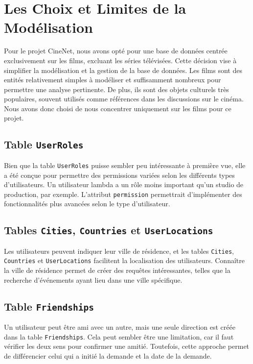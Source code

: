 \section{Les Choix et Limites de la Modélisation}

Pour le projet CineNet, nous avons opté pour une base de données centrée exclusivement sur les films, excluant les séries télévisées. Cette décision vise à simplifier la modélisation et la gestion de la base de données. Les films sont des entités relativement simples à modéliser et suffisamment nombreux pour permettre une analyse pertinente. De plus, ils sont des objets culturels très populaires, souvent utilisés comme références dans les discussions sur le cinéma. Nous avons donc choisi de nous concentrer uniquement sur les films pour ce projet.

\subsection*{Table \texttt{UserRoles}}

Bien que la table \texttt{UserRoles} puisse sembler peu intéressante à première vue, elle a été conçue pour permettre des permissions variées selon les différents types d'utilisateurs. Un utilisateur lambda a un rôle moins important qu'un studio de production, par exemple. L'attribut \texttt{permission} permettrait d'implémenter des fonctionnalités plus avancées selon le type d'utilisateur.

\subsection*{Tables \texttt{Cities}, \texttt{Countries} et \texttt{UserLocations}}

Les utilisateurs peuvent indiquer leur ville de résidence, et les tables \texttt{Cities}, \texttt{Countries} et \texttt{UserLocations} facilitent la localisation des utilisateurs. Connaître la ville de résidence permet de créer des requêtes intéressantes, telles que la recherche d'événements ayant lieu dans une ville spécifique.

\subsection*{Table \texttt{Friendships}}

Un utilisateur peut être ami avec un autre, mais une seule direction est créée dans la table \texttt{Friendships}. Cela peut sembler être une limitation, car il faut vérifier les deux sens pour confirmer une amitié. Toutefois, cette approche permet de différencier celui qui a initié la demande et la date de la demande.

